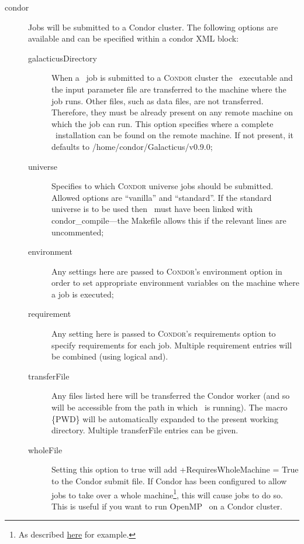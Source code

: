 \begin{description}
\item[{\normalfont \ttfamily condor}] Jobs will be submitted to a {\normalfont \ttfamily Condor} cluster. The following options are available and can be specified within a {\normalfont \ttfamily condor} XML block:
\begin{description}
\item[{\normalfont \ttfamily galacticusDirectory}] When a \glc\ job is submitted to a {\normalfont \scshape Condor} cluster the \glc\ executable and the input parameter file are transferred to the machine where the job runs. Other files, such as data files, are not transferred. Therefore, they must be already present on any remote machine on which the job can run. This option specifies where a complete \glc\ installation can be found on the remote machine. If not present, it defaults to {\normalfont \ttfamily /home/condor/Galacticus/v0.9.0};
\item[{\normalfont \ttfamily universe}] Specifies to which {\normalfont \scshape Condor} universe jobs should be submitted. Allowed options are ``vanilla'' and ``standard''. If the standard universe is to be used then \glc\ must have been linked with {\normalfont \ttfamily condor\_compile}---the {\normalfont \ttfamily Makefile} allows this if the relevant lines are uncommented;
\item[{\normalfont \ttfamily environment}] Any settings here are passed to {\normalfont \scshape Condor}'s {\normalfont \ttfamily environment} option in order to set appropriate environment variables on the machine where a job is executed;
\item[{\normalfont \ttfamily requirement}] Any setting here is passed to {\normalfont \scshape Condor}'s {\normalfont \ttfamily requirements} option to specify requirements for each job. Multiple {\normalfont \ttfamily requirement} entries will be combined (using logical and).
\item[{\normalfont \ttfamily transferFile}] Any files listed here will be transferred the Condor worker (and so will be accessible from the path in which \glc\ is running). The macro {\normalfont \ttfamily \{PWD\}} will be automatically expanded to the present working directory. Multiple {\normalfont \ttfamily transferFile} entries can be given.
\item [{\normalfont \ttfamily wholeFile}] Setting this option to {\normalfont \ttfamily true} will add {\normalfont \ttfamily +RequiresWholeMachine = True} to the Condor submit file. If Condor has been configured to allow jobs to take over a whole machine\footnote{As described \protect\href{https://www-auth.cs.wisc.edu/lists/condor-users/2009-January/msg00086.shtml}{here} for example.}, this will cause jobs to do so. This is useful if you want to run OpenMP \glc\ on a Condor cluster.

\end{description}
\end{description}
